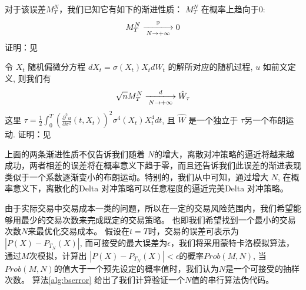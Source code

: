 对于该误差$M_T^N$，我们已知它有如下的渐进性质：
$M_T^N$ 在概率上趋向于0:
\begin{equation}
M_T^N\xlongrightarrow[N\rightarrow +\infty]{\mathbb{P}}0
\end{equation}
证明：见\cite{ContinuousMartingaleAndBrownianMotion}

令 $X_t$ 随机偏微分方程 $dX_t=\sigma(X_t)X_tdW_t$ 的解所对应的随机过程, $u$ 如前文定义, 则我们有 
\begin{equation}
\sqrt{n}M_T^N\xlongrightarrow[N\rightarrow +\infty]{d} \hat{W}_\tau
\end{equation}
这里 $\tau=\frac{1}{2}\int_0^T(\frac{\partial^2 u}{\partial x^2}(t,X_t))^2\sigma^4(X_t)X_t^4dt$, 且 $\hat{W}$ 是一个独立于 $\tau$另一个布朗运动.
证明：见\cite{rootzen1980}

上面的两条渐进性质不仅告诉我们随着 $N$的增大，离散对冲策略的逼近将越来越成功，两者相差的误差将在概率意义下趋于零，而且还告诉我们此误差的渐进表现
类似于一个系数逐渐变小的布朗运动。特别的，我们从中可知，通过增大 $N$, 在概率意义下，离散化的Delta 对冲策略可以任意程度的逼近完美Delta 对冲策略。

由于实际交易中交易成本一类的问题，所以在一定的交易风险范围内，我们希望能够用最少的交易次数来完成既定的交易策略。
也即我们希望找到一个最小的交易次数$N$来最优化交易成本。
假设在$t=T$时，交易的误差可表示为$|P(X) - P_{T_N}(X)|$, 而可接受的最大误差为$\epsilon$，我们将采用蒙特卡洛模拟算法，通过$M$次模拟，计算出
$|P(X) - P_{T_N}(X)| < \epsilon$的概率$Prob(M,N)$, 当$Prob(M,N)$的值大于一个预先设定的概率值时，我们认为$N$是一个可接受的抽样次数。
算法\ref{alg:bserror} 给出了我们计算验证一个$N$值的串行算法伪代码。

